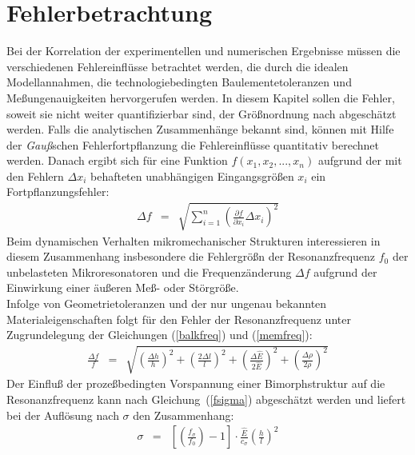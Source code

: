 \section{Fehlerbetrachtung}
\label{fehlerbetrachtung}

Bei der Korrelation der experimentellen und numerischen Ergebnisse
müssen die verschiedenen Fehlereinflüsse betrachtet werden, die durch
die idealen Modellannahmen, die technologiebedingten Baulementetoleranzen
und Meßungenauigkeiten hervorgerufen werden. In diesem Kapitel sollen die
Fehler, soweit sie nicht weiter quantifizierbar sind, der Größnordnung nach
abgeschätzt werden. Falls die analytischen Zusammenhänge bekannt sind,
können mit Hilfe der {\em Gauß}schen Fehlerfortpflanzung die Fehlereinflüsse
quantitativ berechnet werden. Danach ergibt sich für eine Funktion
$f(x_{1}, x_{2},...,x_{n})$ aufgrund der mit den Fehlern $\Delta x_{i}$
behafteten unabhängigen Eingangsgrößen $x_{i}$ ein Fortpflanzungsfehler:
\begin{eqnarray}
\label{gaussfehler}
 {\Delta f} & = & \sqrt{ \sum_{i=1}^{n}
   {\left( \frac{\partial f}{\partial x_{i}} \Delta x_{i} \right)}^2 }
\end{eqnarray}
Beim dynamischen Verhalten mikromechanischer Strukturen interessieren in
diesem Zusammenhang insbesondere die Fehlergrößn der Resonanzfrequenz
$f_{0}$ der unbelasteten Mikroresonatoren und die Frequenzänderung
$\Delta f$ aufgrund der Einwirkung einer äußeren Meß- oder Störgröße.\\
%
Infolge von Geometrietoleranzen und der nur ungenau bekannten
Materialeigenschaften folgt für den Fehler der Resonanzfrequenz
unter Zugrundelegung der Gleichungen (\ref{balkfreq}) und (\ref{memfreq}):\\
\begin{eqnarray}
\label{fehlerfreq}
 \frac{{\Delta f}}{f} & = & \sqrt{
       {\left( \frac{\Delta h}{h} \right)}^2  +
       {\left( \frac{2\Delta l}{l} \right)}^2 +
       {\left( \frac{\Delta \hat E}{2 \hat E} \right)}^2 +
       {\left( \frac{\Delta \rho}{2 \rho} \right)}^2 }
\end{eqnarray}
Der Einfluß der prozeßbedingten Vorspannung einer Bimorphstruktur auf die
Resonanzfrequenz kann nach Gleichung~(\ref{fsigma}) abgeschätzt werden und
liefert bei der Auflösung nach $\sigma$ den Zusammenhang:
\begin{eqnarray}
\label{sigmageom}
 \sigma & = & \left[ \left( \frac{f_{\sigma}}{f_{0}} \right) - 1 \right]
              \cdot \frac{\hat E}{c_{\sigma}}
              \left( \frac{h}{l} \right)^2
\end{eqnarray}
